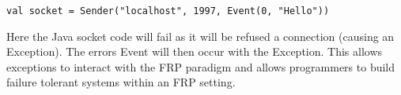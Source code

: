 \begin{verbatim}
val socket = Sender("localhost", 1997, Event(0, "Hello")) 
\end{verbatim}

  Here the Java socket code will fail as it will be refused a connection (causing an Exception). The errors Event
  will then occur with the Exception. This allows exceptions to interact with the FRP paradigm and allows programmers to 
  build failure tolerant systems within an FRP setting.